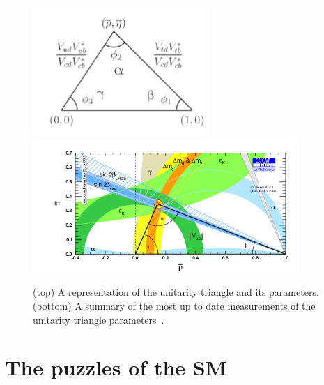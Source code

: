 \begin{figure}[h!]
\centering 
\includegraphics[width=0.6\textwidth]{Introduction/figs/Unitarity_triangle.png}
\includegraphics[width=0.9\textwidth]{Introduction/figs/Unitarity_triangle_HFAG.png}
\caption{(top) A representation of the unitarity triangle and its parameters.
(bottom) A summary of the most up to date measurements of the unitarity triangle parameters~\cite{Charles:2015gya}.}
\label{fig:unitarity_triangle}
\end{figure}
 
 
 
 
\section{The puzzles of the SM}
\label{sec:SMproblems}

